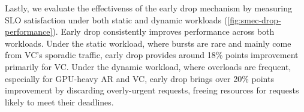 Lastly, we evaluate the effectivenss of the early drop mechanism by measuring SLO satisfaction under both static and dynamic workloads (\autoref{fig:smec-drop-performance}). 
Early drop consistently improves performance across both workloads.
Under the static workload, where bursts are rare and mainly come from VC's sporadic traffic, early drop provides around 18\% points improvement primarily for VC.
Under the dynamic workload, where overloads are frequent, especially for GPU-heavy AR and VC, early drop brings over 20\% points improvement by discarding overly-urgent requests, freeing resources for requests likely to meet their deadlines. 
